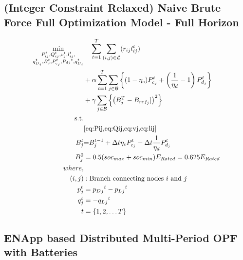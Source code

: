 \documentclass{article}
\begin{document}
\subsection*{(Integer Constraint Relaxed) Naive Brute Force Full Optimization Model - Full Horizon}

\begin{align}
    \min_{
    \substack{
    P_{ij}^t, Q_{ij}^t, v_{j}^t, l_{ij}^t, \\
    q_{D_j}^t, B_{j}^{t}, P_{c_j}^t, P_d{_j}^t, q_{B_j}^t}
    } 
    \vspace{-15ex} %
    & \quad
    \sum_{t = 1}^{T} \sum_{(i, j) \in \mathcal{L}} (r_{ij}l_{ij}^t)  \nonumber\\
    &+ \alpha \sum_{t = 1}^{T} \sum_{j \in \mathcal{B}} \left\{ (1- \eta_c)P_{c_j}^t + \left(\frac{1}{\eta_d}-1\right) P_{d_j}^t \right\} \nonumber\\
    &+ \gamma \sum_{j \in \mathcal{B}} \left\{ \left(B^{T}_{j} - B_{ref_{j}}]\right)^2\right\} \\
    \text{s.t.} & {}\nonumber \\
    {} & {\cref{eq:Pij,eq:Qij,eq:vj,eq:lij}} \\
    {\color{darkgreen}{ B_{j}^{t} }} &\color{darkgreen}{=} { \color{darkgreen}{ B_{j}^{t-1} + \Delta t  \eta_c P_{c_j}^t - \Delta t\frac{1}{\eta_d} P_{d_j}^t } } \\
    { B_{j}^{0} } &= { 0.5(soc_{max}+soc_{min})E_{Rated} = 0.625E_{Rated}} \\
    {where,} & {} \\
    {(i, j)} &: {\text{Branch connecting nodes $i$ and $j$}} \\
    {p_j^t} &= {p_D{_j}^t - p_L{_j}^t} \\
    {q_j^t} &= {-q_L{_j}^t} \\
    {t} &= {\{1, 2, \ldots T\}}
\end{align}

\subsection{ENApp based Distributed Multi-Period OPF with Batteries}
\end{document}
